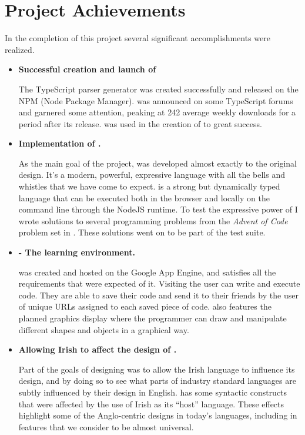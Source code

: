 \section{Project Achievements}
In the completion of this project several significant accomplishments were realized.
\begin{itemize}
    \item \textbf{Successful creation and launch of \tsPEG{}}

        The TypeScript parser generator \tsPEG{} was created successfully and released on the NPM (Node Package Manager). \tsPEG{} was announced on some TypeScript forums and garnered some attention, peaking at 242 average weekly downloads for a period after its release. \tsPEG{} was used in the creation of \Setanta{} to great success.

    \item \textbf{Implementation of \Setanta{}.}

        As the main goal of the project, \Setanta{} was developed almost exactly to the original design. It's a modern, powerful, expressive language with all the bells and whistles that we have come to expect. \Setanta{} is a strong but dynamically typed language that can be executed both in the browser and locally on the command line through the NodeJS runtime. To test the expressive power of \Setanta{} I wrote solutions to several programming problems from the \emph{Advent of Code} problem set in \Setanta{}. These solutions went on to be part of the test suite.

    \item \textbf{\trys{} - The \Setanta{} learning environment.}

        \trys{} was created and hosted on the Google App Engine, and satisfies all the requirements that were expected of it. Visiting \trys{} the user can write and execute \Setanta{} code. They are able to save their code and send it to their friends by the user of unique URLs assigned to each saved piece of code. \trys{} also features the planned graphics display where the programmer can draw and manipulate different shapes and objects in a graphical way.

    \item \textbf{Allowing Irish to affect the design of \Setanta{}.}

        Part of the goals of designing \Setanta{} was to allow the Irish language to influence its design, and by doing so to see what parts of industry standard languages are subtly influenced by their design in English. \Setanta{} has some syntactic constructs that were affected by the use of Irish as its ``host'' language. These effects highlight some of the Anglo-centric designs in today's languages, including in features that we consider to be almost universal.


\end{itemize}
